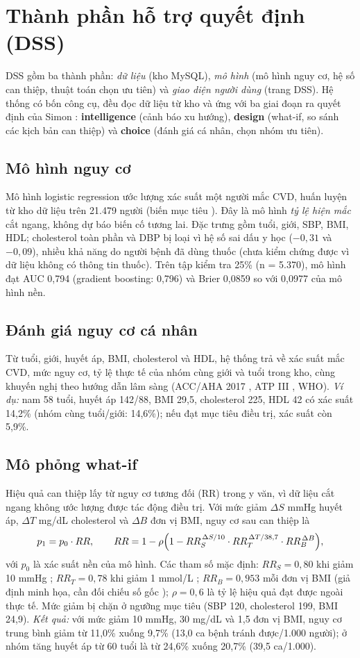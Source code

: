 \section{Thành phần hỗ trợ quyết định (DSS)}
DSS gồm ba thành phần: \emph{dữ liệu} (kho MySQL), \emph{mô hình} (mô hình nguy cơ, hệ số can thiệp, thuật toán chọn ưu tiên) và \emph{giao diện người dùng} (trang DSS). Hệ thống có bốn công cụ, đều đọc dữ liệu từ kho và ứng với ba giai đoạn ra quyết định của Simon \cite{simon1960}: \textbf{intelligence} (cảnh báo xu hướng), \textbf{design} (what-if, so sánh các kịch bản can thiệp) và \textbf{choice} (đánh giá cá nhân, chọn nhóm ưu tiên).

\subsection{Mô hình nguy cơ}
Mô hình logistic regression ước lượng xác suất một người mắc CVD, huấn luyện từ kho dữ liệu trên 21.479 người (biến mục tiêu ). Đây là mô hình \emph{tỷ lệ hiện mắc} cắt ngang, không dự báo biến cố tương lai. Đặc trưng gồm tuổi, giới, SBP, BMI, HDL; cholesterol toàn phần và DBP bị loại vì hệ số sai dấu y học ($-0{,}31$ và $-0{,}09$), nhiều khả năng do người bệnh đã dùng thuốc (chưa kiểm chứng được vì dữ liệu không có thông tin thuốc). Trên tập kiểm tra 25\% (n = 5.370), mô hình đạt AUC 0,794 (gradient boosting: 0,796) và Brier 0,0859 so với 0,0977 của mô hình nền.

\subsection{Đánh giá nguy cơ cá nhân}
Từ tuổi, giới, huyết áp, BMI, cholesterol và HDL, hệ thống trả về xác suất mắc CVD, mức nguy cơ, tỷ lệ thực tế của nhóm cùng giới và tuổi trong kho, cùng khuyến nghị theo hướng dẫn lâm sàng (ACC/AHA 2017 \cite{acc_aha2017}, ATP III \cite{atp3}, WHO). \emph{Ví dụ:} nam 58 tuổi, huyết áp 142/88, BMI 29,5, cholesterol 225, HDL 42 có xác suất 14,2\% (nhóm cùng tuổi/giới: 14,6\%); nếu đạt mục tiêu điều trị, xác suất còn 5,9\%.

\subsection{Mô phỏng what-if}
Hiệu quả can thiệp lấy từ nguy cơ tương đối (RR) trong y văn, vì dữ liệu cắt ngang không ước lượng được tác động điều trị. Với mức giảm $\Delta S$ mmHg huyết áp, $\Delta T$ mg/dL cholesterol và $\Delta B$ đơn vị BMI, nguy cơ sau can thiệp là
\[
p_1 = p_0\cdot RR,\qquad RR = 1 - \rho\Bigl(1 - RR_S^{\,\Delta S/10}\cdot RR_T^{\,\Delta T/38{,}7}\cdot RR_B^{\,\Delta B}\Bigr),
\]
với $p_0$ là xác suất nền của mô hình. Các tham số mặc định: $RR_S = 0{,}80$ khi giảm 10 mmHg \cite{ettehad2016}; $RR_T = 0{,}78$ khi giảm 1 mmol/L \cite{ctt2010}; $RR_B = 0{,}953$ mỗi đơn vị BMI (giả định minh họa, cần đối chiếu số gốc \cite{erfc2011}); $\rho = 0{,}6$ là tỷ lệ hiệu quả đạt được ngoài thực tế. Mức giảm bị chặn ở ngưỡng mục tiêu (SBP 120, cholesterol 199, BMI 24,9). \emph{Kết quả:} với mức giảm 10 mmHg, 30 mg/dL và 1,5 đơn vị BMI, nguy cơ trung bình giảm từ 11,0\% xuống 9,7\% (13,0 ca bệnh tránh được/1.000 người); ở nhóm tăng huyết áp từ 60 tuổi là từ 24,6\% xuống 20,7\% (39,5 ca/1.000).

